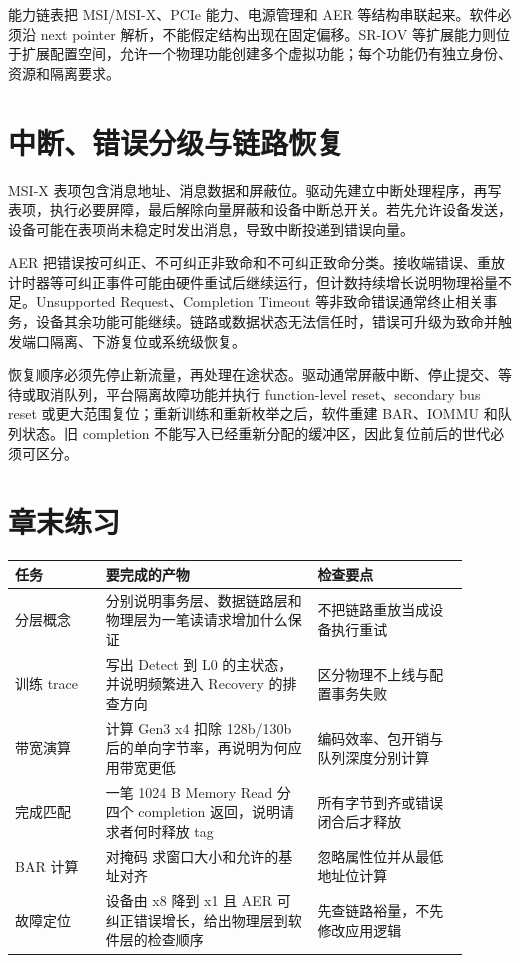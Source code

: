 能力链表把 MSI/MSI-X、PCIe 能力、电源管理和 AER 等结构串联起来。软件必须沿 next pointer 解析，不能假定结构出现在固定偏移。SR-IOV 等扩展能力则位于扩展配置空间，允许一个物理功能创建多个虚拟功能；每个功能仍有独立身份、资源和隔离要求。

\section{中断、错误分级与链路恢复}

MSI-X 表项包含消息地址、消息数据和屏蔽位。驱动先建立中断处理程序，再写表项，执行必要屏障，最后解除向量屏蔽和设备中断总开关。若先允许设备发送，设备可能在表项尚未稳定时发出消息，导致中断投递到错误向量。

AER 把错误按可纠正、不可纠正非致命和不可纠正致命分类。接收端错误、重放计时器等可纠正事件可能由硬件重试后继续运行，但计数持续增长说明物理裕量不足。Unsupported Request、Completion Timeout 等非致命错误通常终止相关事务，设备其余功能可能继续。链路或数据状态无法信任时，错误可升级为致命并触发端口隔离、下游复位或系统级恢复。

恢复顺序必须先停止新流量，再处理在途状态。驱动通常屏蔽中断、停止提交、等待或取消队列，平台隔离故障功能并执行 function-level reset、secondary bus reset 或更大范围复位；重新训练和重新枚举之后，软件重建 BAR、IOMMU 和队列状态。旧 completion 不能写入已经重新分配的缓冲区，因此复位前后的世代必须可区分。

\section*{章末练习}

\begin{longtable}{L{0.18\linewidth}L{0.42\linewidth}L{0.30\linewidth}}
\toprule
任务 & 要完成的产物 & 检查要点 \\
\midrule
分层概念 & 分别说明事务层、数据链路层和物理层为一笔读请求增加什么保证 & 不把链路重放当成设备执行重试 \\
训练 trace & 写出 Detect 到 L0 的主状态，并说明频繁进入 Recovery 的排查方向 & 区分物理不上线与配置事务失败 \\
带宽演算 & 计算 Gen3 x4 扣除 128b/130b 后的单向字节率，再说明为何应用带宽更低 & 编码效率、包开销与队列深度分别计算 \\
完成匹配 & 一笔 1024 B Memory Read 分四个 completion 返回，说明请求者何时释放 tag & 所有字节到齐或错误闭合后才释放 \\
BAR 计算 & 对掩码  求窗口大小和允许的基址对齐 & 忽略属性位并从最低地址位计算 \\
故障定位 & 设备由 x8 降到 x1 且 AER 可纠正错误增长，给出物理层到软件层的检查顺序 & 先查链路裕量，不先修改应用逻辑 \\
\bottomrule
\end{longtable}


